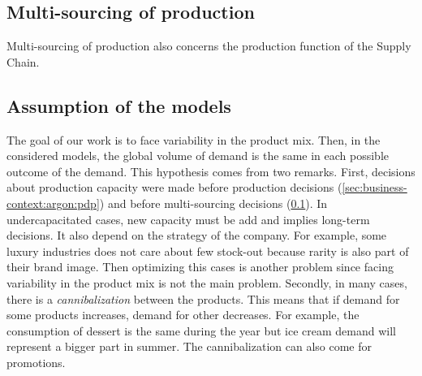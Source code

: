 \subsection{Multi-sourcing of production}
\label{sec:business-context:argon:multi-sourcing}


Multi-sourcing of production also concerns the production function of the Supply Chain.



\subsection{Assumption of the models}


The goal of our work is to face variability in the product mix.
Then, in the considered models, the global volume of demand is the same in each possible outcome of the demand.
This hypothesis comes from two remarks.
First, decisions about production capacity were made before production decisions (\cref{sec:business-context:argon:pdp}) and before multi-sourcing decisions (\cref{sec:business-context:argon:multi-sourcing}).
In undercapacitated cases, new capacity must be add and implies long-term decisions.
It also depend on the strategy of the company.
For example, some luxury industries does not care about few stock-out because rarity is also part of their brand image.
Then optimizing this cases is another problem since facing variability in the product mix is not the main problem.
Secondly, in many cases, there is a \emph{cannibalization} between the products.
This means that if demand for some products increases, demand for other decreases.
For example, the consumption of dessert is the same during the year but ice cream demand will represent a bigger part in summer.
The cannibalization can also come for promotions.







